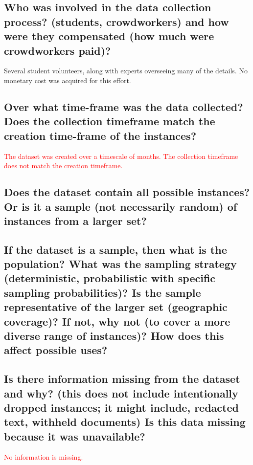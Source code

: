 \subsection*{Who was involved in the data collection process? (\eg students, crowdworkers) and how were they compensated (\eg how much were crowdworkers paid)?}
\noindent Several student volunteers, along with experts overseeing many of the details. No monetary cost was acquired for this effort.

\subsection*{Over what time-frame was the data collected? Does the collection timeframe match the creation time-frame of the instances?}
\noindent
\textcolor{red}{
The dataset was created over a timescale of months. The collection timeframe does not match the creation timeframe.}


\subsection*{Does the dataset contain all possible instances? Or is it a sample (not necessarily random) of instances from a larger set?}
\noindent
\subsection*{If the dataset is a sample, then what is the population? What was the sampling strategy (\eg deterministic, probabilistic with specific sampling probabilities)? Is the sample representative of the larger set (\eg geographic coverage)? If not, why not (\eg to cover a more diverse range of instances)? How does this affect possible uses?}
\noindent
\subsection*{Is there information missing from the dataset and why? (this does not include intentionally dropped instances; it might include, \eg redacted text, withheld documents) Is this data missing because it was unavailable?}
\noindent
\textcolor{red}{
No information is missing.
}
